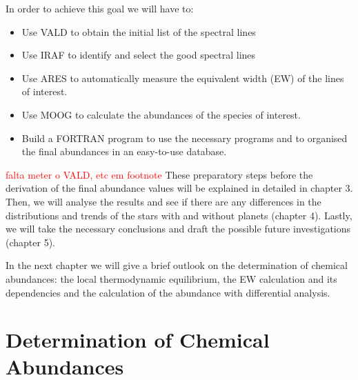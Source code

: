\documentclass[dvips,12pt,a4paper]{report}
\begin{document}
{In order to achieve this goal we will have to:

\begin{itemize}
\item Use VALD to obtain the initial list of the spectral lines
\item Use IRAF to identify and select the good spectral lines
\item Use ARES to automatically measure the equivalent width (EW) of the lines of interest.
\item Use MOOG to calculate the abundances of the species of interest.
\item Build a FORTRAN program to use the necessary programs and to organised the final abundances in an easy-to-use database.
\end{itemize}
\textcolor{red}{falta meter o VALD, etc em footnote}
These preparatory steps before the derivation of the final abundance values will be explained in detailed in chapter 3. Then, we will analyse the results and see if there are any differences in the distributions and trends of the stars with and without planets (chapter 4). Lastly, we will take the necessary conclusions and draft the possible future investigations (chapter 5).

In the next chapter we will give a brief outlook on the determination of chemical abundances: the local thermodynamic equilibrium, the EW calculation and its dependencies and the calculation of the abundance with differential analysis.





\chapter{Determination of Chemical Abundances}

}
\end{document}
